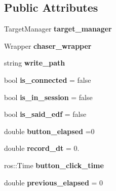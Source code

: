 \subsection*{Public Attributes}
\begin{DoxyCompactItemize}
\item 
Target\+Manager {\bfseries target\+\_\+manager}\hypertarget{class_q_node_adc66765125dfd755d5e7f0c0eb6e6395}{}\label{class_q_node_adc66765125dfd755d5e7f0c0eb6e6395}

\item 
Wrapper {\bfseries chaser\+\_\+wrapper}\hypertarget{class_q_node_ad2d828488fb632a008c7d3ee0e1d1fa2}{}\label{class_q_node_ad2d828488fb632a008c7d3ee0e1d1fa2}

\item 
string {\bfseries write\+\_\+path}\hypertarget{class_q_node_a0967d1922eeb7e39eedca309c7003d23}{}\label{class_q_node_a0967d1922eeb7e39eedca309c7003d23}

\item 
bool {\bfseries is\+\_\+connected} = false\hypertarget{class_q_node_a98b08e7704b00df8648f8c08dffe950c}{}\label{class_q_node_a98b08e7704b00df8648f8c08dffe950c}

\item 
bool {\bfseries is\+\_\+in\+\_\+session} = false\hypertarget{class_q_node_a6ace2d0aa89adecfe699b3f1c3ce0b0f}{}\label{class_q_node_a6ace2d0aa89adecfe699b3f1c3ce0b0f}

\item 
bool {\bfseries is\+\_\+said\+\_\+edf} = false\hypertarget{class_q_node_a9db73b60d8ffd6ac1e64ab5620f2db49}{}\label{class_q_node_a9db73b60d8ffd6ac1e64ab5620f2db49}

\item 
double {\bfseries button\+\_\+elapsed} =0\hypertarget{class_q_node_a2893bbeba854c1cc89d2271804325b7b}{}\label{class_q_node_a2893bbeba854c1cc89d2271804325b7b}

\item 
double {\bfseries record\+\_\+dt} = 0.\hypertarget{class_q_node_ad1f3252201b932fc5d39b4f80349c7e2}{}\label{class_q_node_ad1f3252201b932fc5d39b4f80349c7e2}

\item 
ros\+::\+Time {\bfseries button\+\_\+click\+\_\+time}\hypertarget{class_q_node_a96e6599c14732ded065ae6a5b004f872}{}\label{class_q_node_a96e6599c14732ded065ae6a5b004f872}

\item 
double {\bfseries previous\+\_\+elapsed} = 0\hypertarget{class_q_node_a4b5f0a40821fbb176de620cb5a3921f7}{}\label{class_q_node_a4b5f0a40821fbb176de620cb5a3921f7}


\end{DoxyCompactItemize}
